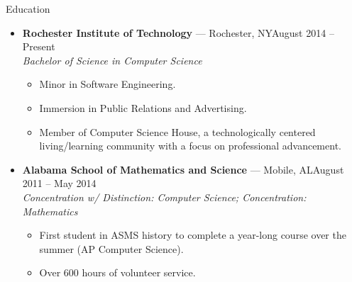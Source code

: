 \documentclass[10pt,oneside]{article}
\newenvironment{ressection}[1]{
	\vspace{3pt}
	{\fontfamily{bch}\selectfont\Large#1}
	\begin{itemize}
	\vspace{2pt}
}{
	\end{itemize}
}
\newcommand{\ressubitem}[1]{
	\vspace{-1pt}
	\item \begin{flushleft} #1 \end{flushleft}
}
\newcommand{\resbigitem}[3]{
	\vspace{-3pt}
	\item
	\textbf{#1} --- #2 \\
	\textit{#3}
}
\newenvironment{ressubsec}[3]{
	\resbigitem{#1}{#2}{#3}
	\vspace{-1pt}
	\begin{itemize}
}{
	\end{itemize}
}
\begin{document}
\begin{ressection}{Education}

	\begin{ressubsec}{Rochester Institute of Technology}{Rochester, NY\hfill August 2014 -- Present}{Bachelor of Science in Computer Science}
		\ressubitem{Minor in Software Engineering.}
		\ressubitem{Immersion in Public Relations and Advertising.}
		\ressubitem{Member of Computer Science House, a technologically centered living/learning community with a focus on professional advancement.}
	\end{ressubsec}
	
	\begin{ressubsec}{Alabama School of Mathematics and Science}{Mobile, AL\hfill August 2011 -- May 2014}{Concentration w/ Distinction: Computer Science; Concentration: Mathematics}
		\ressubitem{First student in ASMS history to complete a year-long course over the summer (AP Computer Science).}
		\ressubitem{Over 600 hours of volunteer service.}
	\end{ressubsec}
	
	

\end{ressection}

\vspace{20pt}{\selectfont\Large References: Available upon request}
\end{document}

